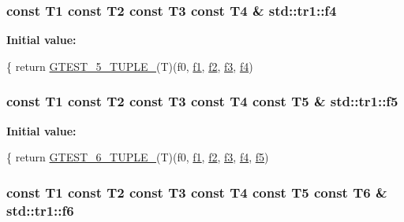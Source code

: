 \hypertarget{namespacestd_1_1tr1_adc796e02b7385d526aff708189564f67}{
\subsubsection[{f4}]{\setlength{\rightskip}{0pt plus 5cm}const T1 const T2 const T3 const T4 \& std\+::tr1\+::f4}}\label{namespacestd_1_1tr1_adc796e02b7385d526aff708189564f67}
{\bfseries Initial value\+:}
\begin{DoxyCode}
\{
  \textcolor{keywordflow}{return} \hyperlink{gtest-tuple_8h_a64e6f4a4cf55f62cde94066c6d5d5c74}{GTEST\_5\_TUPLE\_}(T)(f0, \hyperlink{namespacestd_1_1tr1_a9c0fa65b105f8e2f58ba59ecf75fd000}{f1}, \hyperlink{namespacestd_1_1tr1_a87dd9e009868361317f587126dba63d4}{f2}, \hyperlink{namespacestd_1_1tr1_a0f7c3b47d27d42d82d1a333ea420ce4e}{f3}, \hyperlink{namespacestd_1_1tr1_adc796e02b7385d526aff708189564f67}{f4})
\end{DoxyCode}
\hypertarget{namespacestd_1_1tr1_a9c1eb66b2b2fa321942af95405232a0d}{
\subsubsection[{f5}]{\setlength{\rightskip}{0pt plus 5cm}const T1 const T2 const T3 const T4 const T5 \& std\+::tr1\+::f5}}\label{namespacestd_1_1tr1_a9c1eb66b2b2fa321942af95405232a0d}
{\bfseries Initial value\+:}
\begin{DoxyCode}
\{
  \textcolor{keywordflow}{return} \hyperlink{gtest-tuple_8h_a53f36c86a979ed8285bf3c6f82f16483}{GTEST\_6\_TUPLE\_}(T)(f0, \hyperlink{namespacestd_1_1tr1_a9c0fa65b105f8e2f58ba59ecf75fd000}{f1}, \hyperlink{namespacestd_1_1tr1_a87dd9e009868361317f587126dba63d4}{f2}, \hyperlink{namespacestd_1_1tr1_a0f7c3b47d27d42d82d1a333ea420ce4e}{f3}, \hyperlink{namespacestd_1_1tr1_adc796e02b7385d526aff708189564f67}{f4}, \hyperlink{namespacestd_1_1tr1_a9c1eb66b2b2fa321942af95405232a0d}{f5})
\end{DoxyCode}
\hypertarget{namespacestd_1_1tr1_a6b62f32e1e3e21bceb94eb46c4cbfd56}{
\subsubsection[{f6}]{\setlength{\rightskip}{0pt plus 5cm}const T1 const T2 const T3 const T4 const T5 const T6 \& std\+::tr1\+::f6}}\label{namespacestd_1_1tr1_a6b62f32e1e3e21bceb94eb46c4cbfd56}
